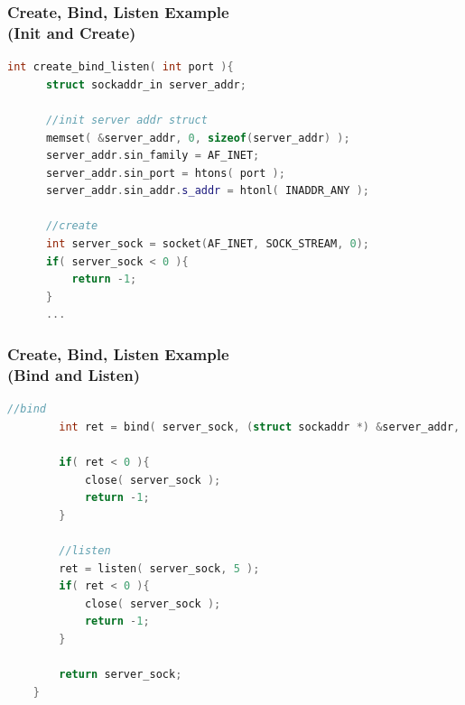 \documentclass[aspectratio=43]{beamer}
\begin{document}
\begin{frame}[fragile]
  \frametitle{Create, Bind, Listen Example\\ (Init and Create)}

  \begin{lstlisting}[language=C++,basicstyle=\ttfamily\footnotesize,commentstyle=\color{commgreen},keywordstyle=\color{blue},breaklines=true]
  int create_bind_listen( int port ){
      struct sockaddr_in server_addr;
  
      //init server addr struct
      memset( &server_addr, 0, sizeof(server_addr) );
      server_addr.sin_family = AF_INET;
      server_addr.sin_port = htons( port );
      server_addr.sin_addr.s_addr = htonl( INADDR_ANY );
      
      //create
      int server_sock = socket(AF_INET, SOCK_STREAM, 0);
      if( server_sock < 0 ){
          return -1;
      }
      ...
  \end{lstlisting}
\end{frame}

\begin{frame}[fragile]
  \frametitle{Create, Bind, Listen Example\\ (Bind and Listen)}

  \begin{lstlisting}[language=C++,basicstyle=\ttfamily\footnotesize,commentstyle=\color{commgreen},keywordstyle=\color{blue},breaklines=true]
	    //bind
	    int ret = bind( server_sock, (struct sockaddr *) &server_addr, sizeof(server_addr) );

	    if( ret < 0 ){
	        close( server_sock );
	        return -1;
	    }

	    //listen
	    ret = listen( server_sock, 5 );
	    if( ret < 0 ){
	        close( server_sock );
	        return -1;
	    }
	    
	    return server_sock;
	}
  \end{lstlisting}
\end{frame}
\end{document}
